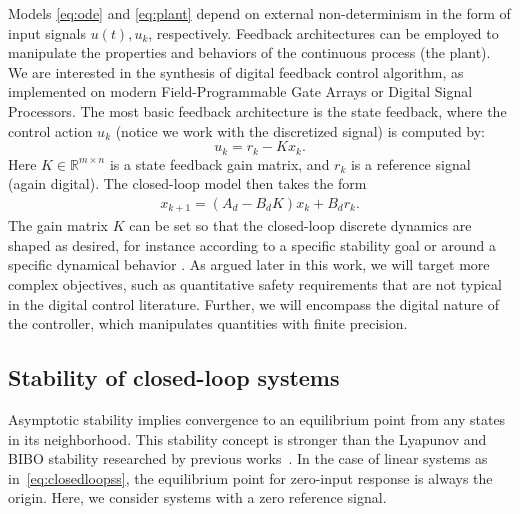 \documentclass[runningheads,a4paper]{llncs}
\begin{document}
Models \eqref{eq:ode} and \eqref{eq:plant} depend on external non-determinism in the form of input signals $u (t), u_k$, respectively. 
Feedback architectures can be employed to manipulate the properties and behaviors of the continuous process (the plant).   
We are interested in the synthesis of digital feedback control algorithm, 
as implemented on modern Field-Programmable Gate Arrays or Digital Signal Processors. 
The most basic feedback architecture is the state feedback, 
where the control action $u_k$ (notice we work with the discretized signal) is computed by: 
%
\begin{equation}
\label{eq:controlaction}
u_k = r_{k} - K x_k. 
\end{equation}
%
Here $K \in \mathbb{R}^{m \times n}$ is a state feedback gain matrix, 
and $r_{k}$ is a reference signal (again digital).   
%
The closed-loop model then takes the form 
\begin{align}
\label{eq:closedloopss}
x_{k+1} = ( A_d - B_d K ) x_k + B_d r_k.
\end{align}
The gain matrix $K$ can be set so that the closed-loop discrete dynamics are shaped as desired, 
for instance according to a specific stability goal or around a specific dynamical behavior \cite{astrom1997computer}. 
As argued later in this work, we will target more complex objectives, such as quantitative safety requirements that are not typical in the digital control literature. 
Further, we will encompass the digital nature of the controller, which manipulates quantities with finite precision. 

\subsection{Stability of closed-loop systems}
\label{ssec:stability}


Asymptotic stability implies convergence to an equilibrium point from any states in its neighborhood. This stability concept is stronger than the Lyapunov and BIBO stability researched by previous works~\cite{DBLP:conf/emsoft/RavanbakhshS16,DBLP:journals/corr/AbateBCCDKK16,DBLP:conf/hybrid/RouxJG15,
DBLP:conf/hybrid/WangGRJF16}. In the case of linear systems as 
in~\eqref{eq:closedloopss}, the equilibrium point for zero-input 
response is always the  origin.  Here, we consider systems with 
a zero reference signal.
\end{document}
